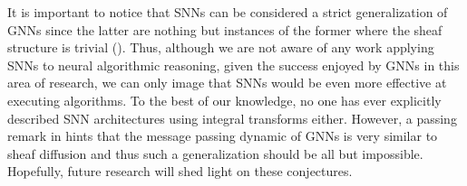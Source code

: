 \documentclass[11pt,a4paper,openright,twoside]{report}
\theoremstyle{plain}
\theoremstyle{definition}
\begin{document}
It is important to notice that SNNs can be considered a strict generalization of GNNs  since the latter are nothing but instances of the former where the sheaf structure is trivial (\cite{bodnar2022neural}). Thus, although we are not aware of any work applying SNNs to neural algorithmic reasoning, given the success enjoyed by GNNs in this area of research, we can only image that SNNs would be even more effective at executing algorithms. 
To the best of our knowledge, no one has ever explicitly described SNN architectures using integral transforms either. However, a passing remark in \cite{dudzik2024asynchronous} hints that the message passing dynamic of GNNs is very similar to sheaf diffusion and thus such a generalization should be all but impossible. Hopefully, future research will shed light on these conjectures.
\end{document}
